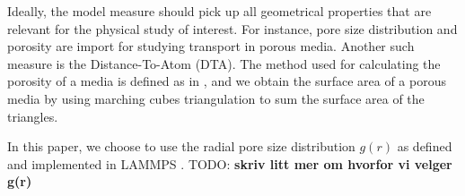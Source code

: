 \documentclass[aps,pre,twocolumn,letterpaper,floatfix,showpacs]{revtex4}
\newcommand{\todo}[1]{ {\color{Magenta} TODO: \color{Blue} \textbf{#1} }}
\begin{document}
Ideally, the model measure should pick up all geometrical properties that are relevant for the physical study of interest. For instance, pore size distribution and porosity are import for studying transport in porous media. Another such measure is the Distance-To-Atom (DTA).
The method used for calculating the porosity of a media is defined as in \cite{gelb1998characterization}, and we obtain the surface area of a porous media by using marching cubes triangulation to sum the surface area of the triangles. 

In this paper, we choose to use the radial pore size distribution $g(r)$ as defined and implemented in LAMMPS \cite{plimpton1995fast}.  \todo{skriv litt mer om hvorfor vi velger g(r)}










\end{document}
